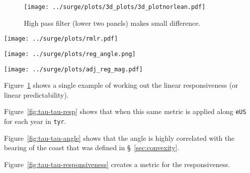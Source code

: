 \begin{figure}
\centering
\texttt{[image: ../surge/plots/3d\_plots/3d\_plotnorlean.pdf]}
 \caption{High pass filter (lower two panels) makes small difference.}
 \label{fig:tau-tau-r-no}
\end{figure}


\begin{figure*}
\centering
 \hspace{-40pt} \texttt{[image: ../surge/plots/rmlr.pdf]}
  \vspace{-15pt}
 \caption{Huber regression generalises less well than MLR.}
 \label{fig:tau-tau-resp}
 \hspace{-40pt} \texttt{[image: ../surge/plots/reg\_angle.png]}
  \vspace{-15pt}
 \caption{\texttt{np.arctan2(c0, c1)}}
  \label{fig:tau-tau-angle}
  \hspace{-40pt} \texttt{[image: ../surge/plots/adj\_reg\_mag.pdf]}
   \vspace{-15pt}
  \caption{($\bar{r^2}$)\texttt{*np.square(np.sqrt(c0) + np.sqrt(c1))}. }
   \label{fig:tau-tau-responsiveness}
\end{figure*}

Figure~\ref{fig:tau-tau-r-no} shows a single example of working out the linear
responsiveness (or linear predictability).

Figure~\ref{fig:tau-tau-resp} shows that when this same metric is applied along \texttt{eUS}
for each year in \texttt{tyr}.

Figure~\ref{fig:tau-tau-angle} shows that the angle is highly correlated with
the bearing of the coast that was defined in §~\ref{sec:convexity}.

Figure~\ref{fig:tau-tau-responsiveness} creates a metric for the
responsiveness.
